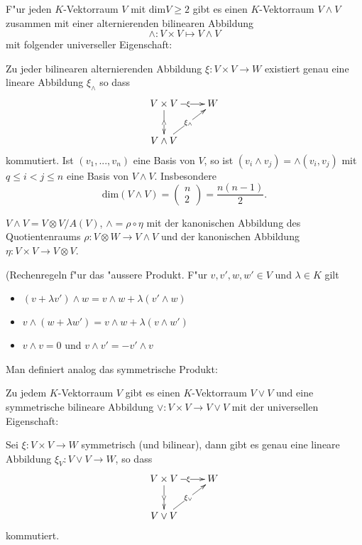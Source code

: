 \documentclass[8pt, a4paper, twocolumn, landscape]{article}
\begin{document}
{\begin{theorem}
F"ur jeden $K$-Vektorraum $V$ mit $\mathrm{dim} V \geq 2$ gibt es einen $K$-Vektorraum $V \wedge V$ zusammen mit einer alternierenden bilinearen Abbildung 
$$\wedge: V \times V \mapsto V \wedge V$$ mit folgender universeller Eigenschaft:

Zu jeder bilinearen alternierenden Abbildung $\xi: V \times V \rightarrow W$ existiert genau eine lineare Abbildung $\xi_\wedge$ so dass
\begin{gather*}
  \xymatrix{V \times V  \ar[d]|{\wedge} \ar[r]|{\xi} & W\\
    V \wedge V \ar[ur]|{\xi_\wedge} & }
\end{gather*}
kommutiert.
Ist $(v_1, ..., v_n)$ eine Basis von $V$, so ist $(v_i \wedge v_j) = \wedge(v_i, v_j)$ mit $q \leq i < j \leq n$ eine Basis von $V \wedge V$. Insbesondere 
$$
\mathrm{dim}(V \wedge V) = \left(\begin{array}{c} n\\ 2 
\end{array} \right) = \frac{n(n-1)}{2}.
$$
\end{theorem}
$V \wedge V = V \otimes V / A(V)$, $\wedge = \rho \circ \eta$ mit der kanonischen Abbildung des Quotientenraums $\rho: V \otimes W \rightarrow V \wedge V$ und der kanonischen Abbildung $\eta: V \times V \rightarrow V \otimes V$.


\begin{remark}(Rechenregeln f"ur das "aussere Produkt.
F"ur $v, v', w, w' \in V$ und $\lambda \in K$ gilt
\begin{itemize}
\item $(v + \lambda v') \wedge w = v  \wedge w + \lambda(v'  \wedge w )$
\item $v  \wedge (w + \lambda w') = v  \wedge w + \lambda(v  \wedge w ')$
\item $v \wedge v = 0$ und $ v \wedge v' = - v' \wedge v$
\end{itemize}
\end{remark}

\begin{theorem}
Man definiert analog das symmetrische Produkt:

Zu jedem $K$-Vektorraum $V$ gibt es einen $K$-Vektorraum $V \vee V$ und eine symmetrische bilineare Abbildung $\vee: V \times V \rightarrow V \vee V$ mit der universellen Eigenschaft:

Sei $\xi : V \times V \rightarrow W$ symmetrisch (und bilinear), dann gibt es genau eine lineare Abbildung $\xi_V: V \vee V \rightarrow W$, so dass
\begin{gather*}
  \xymatrix{V \times V  \ar[d]|{\vee} \ar[r]|{\xi} & W\\
    V \vee V \ar[ur]|{\xi_\vee} & }
\end{gather*}
kommutiert.


\end{theorem}}
\end{document}
